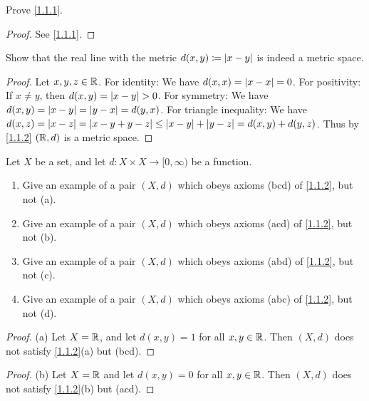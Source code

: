 \exercisesection

\begin{ex}\label{ex:1.1.1}
  Prove \cref{1.1.1}.
\end{ex}

\begin{proof}
  See \cref{1.1.1}.
\end{proof}

\begin{ex}\label{ex:1.1.2}
  Show that the real line with the metric \(d(x, y) \coloneqq \left\lvert x - y\right\rvert\) is indeed a metric space.
\end{ex}

\begin{proof}
  Let \(x, y, z \in \mathbb{R}\).
  For identity:
  We have \(d(x, x) = \left\lvert x - x\right\rvert = 0\).
  For positivity:
  If \(x \neq y\), then \(d(x, y) = \left\lvert x - y\right\rvert > 0\).
  For symmetry:
  We have \(d(x, y) = \left\lvert x - y\right\rvert = \left\lvert y - x\right\rvert = d(y, x)\).
  For triangle inequality:
  We have \(d(x, z) = \left\lvert x - z\right\rvert = \left\lvert x - y + y - z\right\rvert \leq \left\lvert x - y\right\rvert + \left\lvert y - z\right\rvert = d(x, y) + d(y, z)\).
  Thus by \cref{1.1.2} \((\mathbb{R}, d)\) is a metric space.
\end{proof}

\begin{ex}\label{ex:1.1.3}
  Let \(X\) be a set, and let \(d : X \times X \to [0, \infty)\) be a function.
  \begin{enumerate}
    \item Give an example of a pair \((X, d)\) which obeys axioms (bcd) of \cref{1.1.2}, but not (a).
    \item Give an example of a pair \((X, d)\) which obeys axioms (acd) of \cref{1.1.2}, but not (b).
    \item Give an example of a pair \((X, d)\) which obeys axioms (abd) of \cref{1.1.2}, but not (c).
    \item Give an example of a pair \((X, d)\) which obeys axioms (abc) of \cref{1.1.2}, but not (d).
  \end{enumerate}
\end{ex}

\begin{proof}{(a)}
  Let \(X = \mathbb{R}\), and let \(d(x, y) = 1\) for all \(x, y \in \mathbb{R}\).
  Then \((X, d)\) does not satisfy \cref{1.1.2}(a) but (bcd).
\end{proof}

\begin{proof}{(b)}
  Let \(X = \mathbb{R}\) and let \(d(x, y) = 0\) for all \(x, y \in \mathbb{R}\).
  Then \((X, d)\) does not satisfy \cref{1.1.2}(b) but (acd).
\end{proof}

